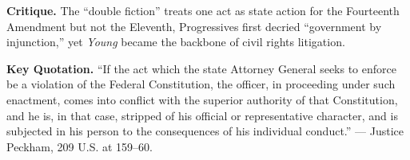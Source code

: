 \documentclass[12pt]{article}
\begin{document}
\textbf{Critique.} The ``double fiction'' treats one act as state action for the Fourteenth Amendment but not the Eleventh, Progressives first decried ``government by injunction,'' yet \textit{Young} became the backbone of civil rights litigation.

\textbf{Key Quotation.} ``If the act which the state Attorney General seeks to enforce be a violation of the Federal Constitution, the officer, in proceeding under such enactment, comes into conflict with the superior authority of that Constitution, and he is, in that case, stripped of his official or representative character, and is subjected in his person to the consequences of his individual conduct.'' --- Justice Peckham, 209 U.S. at 159--60.
\end{document}
